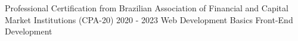 \begin{cvhonors}
  \cvhonor
    {Professional Certification from Brazilian Association of Financial and Capital Market Institutions}
    {(CPA-20)}
    {2020 - 2023}
    {}
  \cvhonor
    {Web Development Basics}
    {}
    {}
    {}
  \cvhonor
    {Front-End Development}
    {}
    {}
    {}
\end{cvhonors}

\vspace{.5cm}